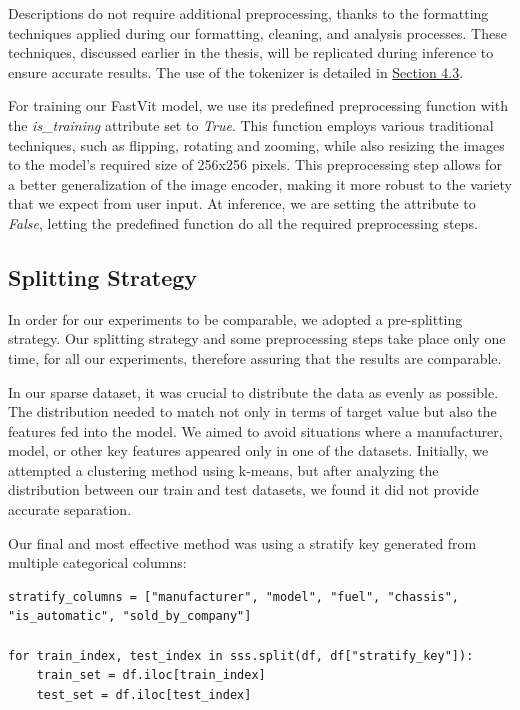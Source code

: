 Descriptions do not require additional preprocessing, thanks to the formatting techniques applied during our formatting, cleaning, and analysis processes. These techniques, discussed earlier in the thesis, will be replicated during inference to ensure accurate results. The use of the tokenizer is detailed in \hyperref[sec:bert]{Section 4.3}. 

For training our FastVit model, we use its predefined preprocessing function with the \textit{is\_training} attribute set to \textit{True}. This function employs various traditional techniques, such as flipping, rotating and zooming, while also resizing the images to the model's required size of 256x256 pixels. This preprocessing step allows for a better generalization of the image encoder, making it more robust to the variety that we expect from user input. At inference, we are setting the attribute to \textit{False}, letting the predefined function do all the required preprocessing steps.

\subsection{Splitting Strategy}
In order for our experiments to be comparable, we adopted a pre-splitting strategy. Our splitting strategy and some preprocessing steps take place only one time, for all our experiments, therefore assuring that the results are comparable.

In our sparse dataset, it was crucial to distribute the data as evenly as possible. The distribution needed to match not only in terms of target value but also the features fed into the model. We aimed to avoid situations where a manufacturer, model, or other key features appeared only in one of the datasets. Initially, we attempted a clustering method using k-means, but after analyzing the distribution between our train and test datasets, we found it did not provide accurate separation.

Our final and most effective method was using a stratify key generated from multiple categorical columns:

\begin{lstlisting}
stratify_columns = ["manufacturer", "model", "fuel", "chassis", "is_automatic", "sold_by_company"]

for train_index, test_index in sss.split(df, df["stratify_key"]):
    train_set = df.iloc[train_index]
    test_set = df.iloc[test_index]
\end{lstlisting}

